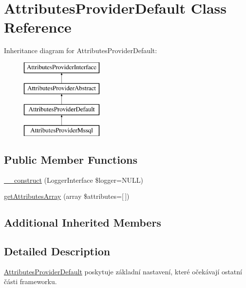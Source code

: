 \hypertarget{class_pes_1_1_database_1_1_handler_1_1_attributes_provider_1_1_attributes_provider_default}{}\section{Attributes\+Provider\+Default Class Reference}
\label{class_pes_1_1_database_1_1_handler_1_1_attributes_provider_1_1_attributes_provider_default}
Inheritance diagram for Attributes\+Provider\+Default\+:\begin{figure}[H]
\begin{center}
\leavevmode
\includegraphics[height=4.000000cm]{class_pes_1_1_database_1_1_handler_1_1_attributes_provider_1_1_attributes_provider_default}
\end{center}
\end{figure}
\subsection*{Public Member Functions}
\begin{DoxyCompactItemize}
\item 
\mbox{\hyperlink{class_pes_1_1_database_1_1_handler_1_1_attributes_provider_1_1_attributes_provider_default_a4d086b03f47931c183f0414bf2da5103}{\+\_\+\+\_\+construct}} (Logger\+Interface \$logger=N\+U\+LL)
\item 
\mbox{\hyperlink{class_pes_1_1_database_1_1_handler_1_1_attributes_provider_1_1_attributes_provider_default_a78e4a9edf711d48cd3ec22eaadf560ea}{get\+Attributes\+Array}} (array \$attributes=\mbox{[}$\,$\mbox{]})
\end{DoxyCompactItemize}
\subsection*{Additional Inherited Members}


\subsection{Detailed Description}
\mbox{\hyperlink{class_pes_1_1_database_1_1_handler_1_1_attributes_provider_1_1_attributes_provider_default}{Attributes\+Provider\+Default}} poskytuje základní nastavení, které očekávají ostatní části frameworku.

